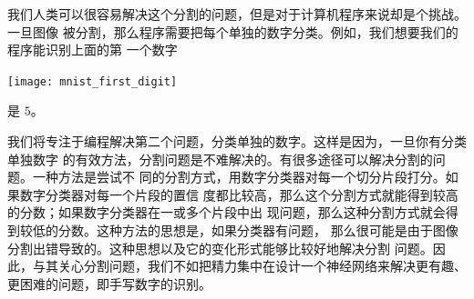 我们人类可以很容易解决这个分割的问题，但是对于计算机程序来说却是个挑战。一旦图像
被分割，那么程序需要把每个单独的数字分类。例如，我们想要我们的程序能识别上面的第
一个数字
\begin{center}
  \texttt{[image: mnist\_first\_digit]}
\end{center}
是 $5$。

我们将专注于编程解决第二个问题，分类单独的数字。这样是因为，一旦你有分类单独数字
的有效方法，分割问题是不难解决的。有很多途径可以解决分割的问题。一种方法是尝试不
同的分割方式，用数字分类器对每一个切分片段打分。如果数字分类器对每一个片段的置信
度都比较高，那么这个分割方式就能得到较高的分数；如果数字分类器在一或多个片段中出
现问题，那么这种分割方式就会得到较低的分数。这种方法的思想是，如果分类器有问题，
那么很可能是由于图像分割出错导致的。这种思想以及它的变化形式能够比较好地解决分割
问题。因此，与其关心分割问题，我们不如把精力集中在设计一个神经网络来解决更有趣、
更困难的问题，即手写数字的识别。

